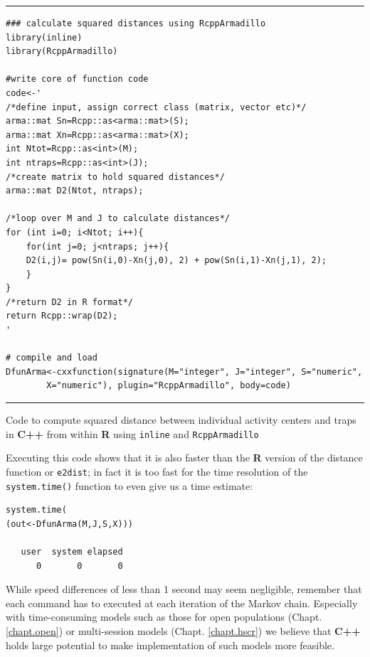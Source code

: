 \begin{panel}[ht]
\centering
\rule[0.15in]{\textwidth}{.03in}
{\small
\begin{verbatim}
### calculate squared distances using RcppArmadillo
library(inline)
library(RcppArmadillo)

#write core of function code
code<-'
/*define input, assign correct class (matrix, vector etc)*/
arma::mat Sn=Rcpp::as<arma::mat>(S);
arma::mat Xn=Rcpp::as<arma::mat>(X);
int Ntot=Rcpp::as<int>(M);
int ntraps=Rcpp::as<int>(J);
/*create matrix to hold squared distances*/
arma::mat D2(Ntot, ntraps);

/*loop over M and J to calculate distances*/
for (int i=0; i<Ntot; i++){
	for(int j=0; j<ntraps; j++){
	D2(i,j)= pow(Sn(i,0)-Xn(j,0), 2) + pow(Sn(i,1)-Xn(j,1), 2);
	}
}
/*return D2 in R format*/
return Rcpp::wrap(D2);
'

# compile and load
DfunArma<-cxxfunction(signature(M="integer", J="integer", S="numeric",
		X="numeric"), plugin="RcppArmadillo", body=code)
\end{verbatim}
}
\rule[-0.15in]{\textwidth}{.03in}
\caption{
Code to compute squared distance between individual activity centers and traps in {\bf C++} from within {\bf R} using {\tt inline} and {\tt RcppArmadillo}
}
\label{mcmc.panel.C1}
\end{panel}

Executing this code shows that it is also faster than the {\bf R} version of the distance function or {\tt e2dist}; in fact it is too fast for the time resolution of the {\tt system.time()} function to even give us a time estimate:
{\small
\begin{verbatim}
system.time(
(out<-DfunArma(M,J,S,X)))

   user  system elapsed 
      0       0       0 
\end{verbatim}
}
While speed differences of less than 1 second may seem negligible,
remember that each command has to executed at each iteration of the Markov chain. Especially with time-consuming models such as those for open populations (Chapt. \ref{chapt.open}) or multi-session models (Chapt. \ref{chapt.hscr}) we believe that {\bf C++} holds large potential to make implementation of such models more feasible.





